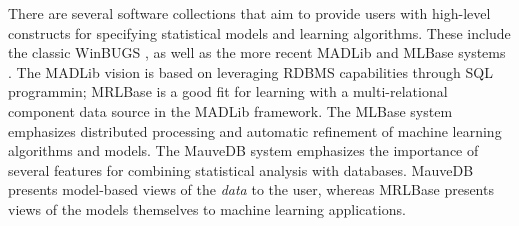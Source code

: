\documentclass{acm_proc_article-sp}
\begin{document}


There are several software collections that aim to provide users with high-level constructs for specifying statistical models and learning algorithms. These include the classic WinBUGS \cite{Lunn2000}, as well as the more recent MADLib \cite{MADlib_VLDB_2012} and MLBase systems \cite{MLbase_ICDR_2013}. The MADLib vision is based on leveraging RDBMS capabilities through SQL programmin; MRLBase is a good fit for learning with a multi-relational component data source in the MADLib framework. 
The MLBase system emphasizes distributed processing and automatic refinement of machine learning algorithms and models.
The MauveDB system \cite{Deshpande2006a} emphasizes the importance of several features for combining statistical analysis with databases.
MauveDB presents model-based views of the {\em data} to the user, whereas MRLBase presents views of the models themselves to machine learning applications. 
\end{document}
